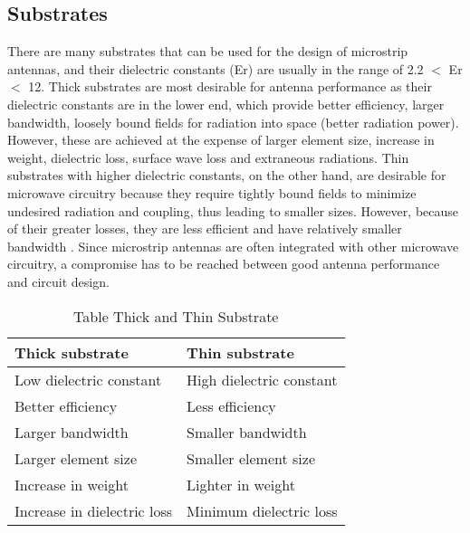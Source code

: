 \documentclass[12pt]{article}
\begin{document}
	         \cleardoublepage
				\subsection{Substrates }\label{sub:Substrates Characteristics}
		           \justify
		            There are many substrates that can be used for the design of microstrip antennas, and their dielectric constants (Er) are usually in the range of 2.2 $<$ Er $<$ 12. Thick substrates are most desirable for antenna performance as their dielectric constants are in the lower end, which provide better efficiency, larger bandwidth, loosely bound fields for radiation into space (better radiation power). However, these are achieved at the expense of larger element size, increase in weight, dielectric loss, surface wave loss and extraneous radiations. Thin substrates with higher dielectric constants, on the other hand, are desirable for microwave circuitry because they require tightly bound fields to minimize undesired radiation and coupling, thus leading to smaller sizes. However, because of their greater losses, they are less efficient and have relatively smaller bandwidth . Since microstrip antennas are often integrated with other microwave circuitry, a compromise has to be reached between good antenna performance and circuit design. 
		            
		            \begin{center}
		            	\begin{table}[H]
		            		\centering
		            		\begin{tabular}{ |l|l|}
		            			\hline
		            			Thick substrate &	Thin substrate \\ \hline
		            			Low dielectric constant & High dielectric constant  \\ \hline
		            			Better efficiency &	Less efficiency  \\ \hline
		            			Larger bandwidth &	Smaller bandwidth  \\ \hline
		            			Larger element size & Smaller element size  \\ \hline
		            			Increase in weight &	Lighter in weight  \\ \hline
		            			Increase in dielectric loss &	Minimum dielectric loss  \\ \hline
		            			
		            			
		            		\end{tabular}
		            				            	\caption{Table Thick and Thin  Substrate }
		            	\end{table}

		            \end{center}
	            
\end{document}
